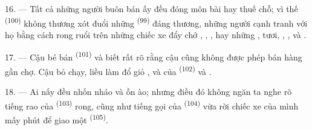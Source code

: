16. --- Tất cả những người buôn bán ấy đều đóng môn bài hay thuế chỗ; vì thế
 \textsuperscript{(100)} không thương xót đuổi những  \textsuperscript{(99)} đáng thương, những người cạnh tranh với họ bằng
cách rong ruổi trên những chiếc xe đẩy chở , ,
,  hay những , 
tươi, , ,  và .

\VUsaut{4.0mm}
\VUsaut{3.0mm}

17. --- Cậu bé bán  \textsuperscript{(101)} và  biết rất rõ
rằng cậu cũng không được phép bán hàng gần chợ. Cậu bỏ chạy, liều làm đổ giỏ
,  và  của 
\textsuperscript{(102)}  và .

18. --- Ai nấy đều nhốn nháo và ồn ào; nhưng điều đó không ngăn ta nghe rõ tiếng rao của
 \textsuperscript{(103)} rong, cũng như tiếng gọi của
 \textsuperscript{(104)} vừa rời chiếc xe của mình mấy phút để
giao một  \textsuperscript{(105)}.
\VUsaut{6.0mm}
\VUfilet{22mm}
